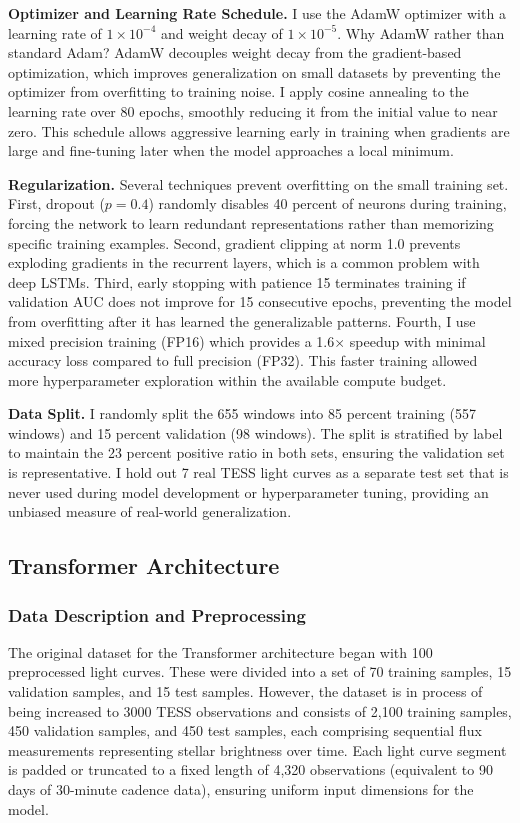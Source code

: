 \documentclass[letterpaper]{article} %
\begin{document}
\textbf{Optimizer and Learning Rate Schedule.} I use the AdamW optimizer with a learning rate of $1 \times 10^{-4}$ and weight decay of $1 \times 10^{-5}$. Why AdamW rather than standard Adam? AdamW decouples weight decay from the gradient-based optimization, which improves generalization on small datasets by preventing the optimizer from overfitting to training noise. I apply cosine annealing to the learning rate over 80 epochs, smoothly reducing it from the initial value to near zero. This schedule allows aggressive learning early in training when gradients are large and fine-tuning later when the model approaches a local minimum.

\textbf{Regularization.} Several techniques prevent overfitting on the small training set. First, dropout ($p=0.4$) randomly disables 40 percent of neurons during training, forcing the network to learn redundant representations rather than memorizing specific training examples. Second, gradient clipping at norm 1.0 prevents exploding gradients in the recurrent layers, which is a common problem with deep LSTMs. Third, early stopping with patience 15 terminates training if validation AUC does not improve for 15 consecutive epochs, preventing the model from overfitting after it has learned the generalizable patterns. Fourth, I use mixed precision training (FP16) which provides a 1.6$\times$ speedup with minimal accuracy loss compared to full precision (FP32). This faster training allowed more hyperparameter exploration within the available compute budget.

\textbf{Data Split.} I randomly split the 655 windows into 85 percent training (557 windows) and 15 percent validation (98 windows). The split is stratified by label to maintain the 23 percent positive ratio in both sets, ensuring the validation set is representative. I hold out 7 real TESS light curves as a separate test set that is never used during model development or hyperparameter tuning, providing an unbiased measure of real-world generalization.

\subsection{Transformer Architecture}
\subsubsection*{Data Description and Preprocessing}
The original dataset for the Transformer architecture began with 100 preprocessed light curves. These were divided into a set of 70 training samples, 15 validation samples, and 15 test samples. However, the dataset is in process of being increased to 3000 TESS observations and consists of 2,100 training samples, 450 validation samples, and 450 test samples, each comprising sequential flux measurements representing stellar brightness over time. Each light curve segment is padded or truncated to a fixed length of 4,320 observations (equivalent to 90 days of 30-minute cadence data), ensuring uniform input dimensions for the model.
\end{document}
